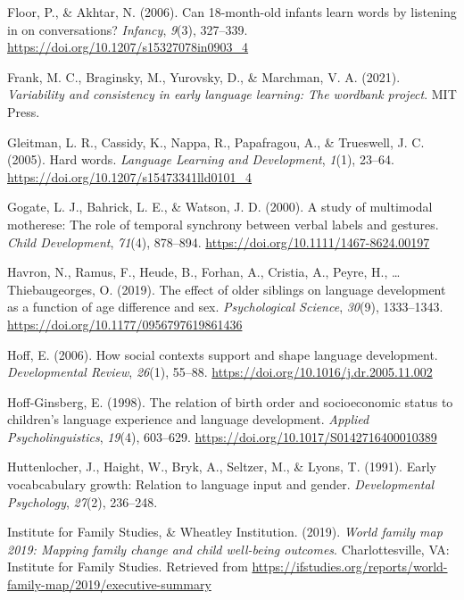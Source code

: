\documentclass[
  english,
  man,floatsintext]{apa6}
\begin{document}
\leavevmode\hypertarget{ref-floor_can_2006}{}%
Floor, P., \& Akhtar, N. (2006). Can 18-month-old infants learn words by listening in on conversations? \emph{Infancy}, \emph{9}(3), 327--339. \url{https://doi.org/10.1207/s15327078in0903_4}

\leavevmode\hypertarget{ref-frank_variability_2021}{}%
Frank, M. C., Braginsky, M., Yurovsky, D., \& Marchman, V. A. (2021). \emph{Variability and consistency in early language learning: The wordbank project}. MIT Press.

\leavevmode\hypertarget{ref-gleitman_hard_2005}{}%
Gleitman, L. R., Cassidy, K., Nappa, R., Papafragou, A., \& Trueswell, J. C. (2005). Hard words. \emph{Language Learning and Development}, \emph{1}(1), 23--64. \url{https://doi.org/10.1207/s15473341lld0101_4}

\leavevmode\hypertarget{ref-gogate_study_2000}{}%
Gogate, L. J., Bahrick, L. E., \& Watson, J. D. (2000). A study of multimodal motherese: The role of temporal synchrony between verbal labels and gestures. \emph{Child Development}, \emph{71}(4), 878--894. \url{https://doi.org/10.1111/1467-8624.00197}

\leavevmode\hypertarget{ref-havron_effect_2019}{}%
Havron, N., Ramus, F., Heude, B., Forhan, A., Cristia, A., Peyre, H., \ldots{} Thiebaugeorges, O. (2019). The effect of older siblings on language development as a function of age difference and sex. \emph{Psychological Science}, \emph{30}(9), 1333--1343. \url{https://doi.org/10.1177/0956797619861436}

\leavevmode\hypertarget{ref-hoff_how_2006}{}%
Hoff, E. (2006). How social contexts support and shape language development. \emph{Developmental Review}, \emph{26}(1), 55--88. \url{https://doi.org/10.1016/j.dr.2005.11.002}

\leavevmode\hypertarget{ref-hoff-ginsberg_relation_1998}{}%
Hoff-Ginsberg, E. (1998). The relation of birth order and socioeconomic status to children's language experience and language development. \emph{Applied Psycholinguistics}, \emph{19}(4), 603--629. \url{https://doi.org/10.1017/S0142716400010389}

\leavevmode\hypertarget{ref-huttenlocher_early_1991}{}%
Huttenlocher, J., Haight, W., Bryk, A., Seltzer, M., \& Lyons, T. (1991). Early vocabcabulary growth: Relation to language input and gender. \emph{Developmental Psychology}, \emph{27}(2), 236--248.

\leavevmode\hypertarget{ref-institute_for_family_studies_world_2019}{}%
Institute for Family Studies, \& Wheatley Institution. (2019). \emph{World family map 2019: Mapping family change and child well-being outcomes}. Charlottesville, VA: Institute for Family Studies. Retrieved from \url{https://ifstudies.org/reports/world-family-map/2019/executive-summary}
\end{document}
